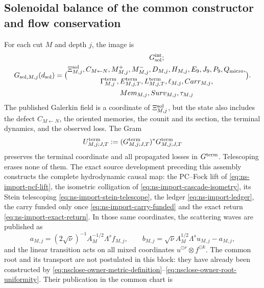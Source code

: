 \subsection{Solenoidal balance of the common constructor and flow conservation}

For each cut $M$ and depth $j$, the image is
\begin{equation}\label{eq:pdf2-g-sol-explicito}
 \mathfrak G_{{\rm sol},M,j}(d_{\rm sol})=
 \bigl(
 \begin{gathered}
  \mathfrak G_{\rm sol}^{\rm int};\\
  \Xi_{M,j}^{\rm sol},C_{M\leftarrow N},M_{M,j}^+,M_{M,j}^-,
  D_{M,j},H_{M,j},E_9,J_9,P_9,Q_{\rm micro},\\
  \Gamma_{M,j}^{\rm term},\mathcal E_{M,j,T}^{\rm term},
  L_{M,j,T}^{\rm term},\ell_{M,j},\operatorname{Carr}_{M,j},\\
  \operatorname{Mem}_{M,j},\operatorname{Surv}_{M,j},\tau_{M,j}
 \end{gathered}
 \bigr).
\end{equation}
The published Galerkin field is a coordinate of $\Xi_{M,j}^{\rm sol}$, but the
state also includes the defect $C_{M\leftarrow N}$, the oriented memories, the
counit and its section, the terminal dynamics, and the observed loss. The Gram
\begin{equation}\label{eq:pdf2-g-sol-gram-estructural}
 U_{M,j;J,T}^{\rm term}
 :=(\mathbf G_{M,j;J,T}^{\rm term})^*
    \mathbf G_{M,j;J,T}^{\rm term}
\end{equation}
preserves the terminal coordinate and all propagated losses in $\mathbf G^{\rm term}$. Telescoping erases none of them. The exact source development preceding this assembly constructs the complete hydrodynamic causal map: the PC--Fock lift of \eqref{eq:ns-import-pcf-lift}, the isometric colligation of \eqref{eq:ns-import-cascade-isometry}, its Stein telescoping \eqref{eq:ns-import-stein-telescope}, the ledger \eqref{eq:ns-import-ledger}, the carry funded only once \eqref{eq:ns-import-carry-funded} and the exact return \eqref{eq:ns-import-exact-return}. In those same coordinates, the scattering waves are published as
\begin{equation}\label{eq:pdf2-g-sol-ondas-dato}
 a_{M,j}=(2\sqrt\nu)^{-1}A_M^{-1/2}\Lambda^sf_{M,j},
 \qquad
 b_{M,j}=\sqrt\nu A_M^{1/2}\Lambda^su_{M,j}-a_{M,j},
\end{equation}
and the linear transition acts on all mixed coordinates $u^{\odot r}\otimes f^{\odot k}$. The common root and its transport are not postulated in this block: they have already been constructed by \eqref{eq:nsclose-owner-metric-definition}--\eqref{eq:nsclose-owner-root-uniformity}. Their publication in the common chart is
